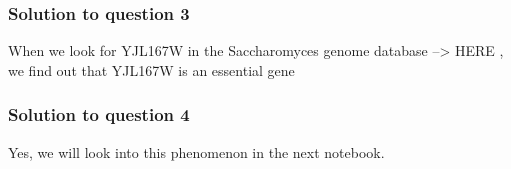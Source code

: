 \documentclass[11pt]{article}
\begin{document}
    \hypertarget{solution-to-question-3}{%
\subsubsection{Solution to question 3}\label{solution-to-question-3}}

When we look for YJL167W in the Saccharomyces genome database
--\textgreater{} HERE , we find out that YJL167W is an essential gene

    \hypertarget{solution-to-question-4}{%
\subsubsection{Solution to question 4}\label{solution-to-question-4}}

Yes, we will look into this phenomenon in the next notebook.


    
    
    
\end{document}
